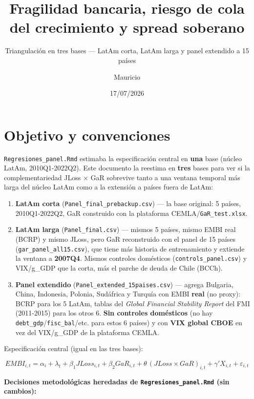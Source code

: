 \documentclass[
]{article}
\title{Fragilidad bancaria, riesgo de cola del crecimiento y spread
soberano}
\subtitle{Triangulación en tres bases --- LatAm corta, LatAm larga y
panel extendido a 15 países}
\author{Mauricio}
\date{17/07/2026}
\providecommand{\tightlist}{%
  \setlength{\itemsep}{0pt}\setlength{\parskip}{0pt}}
\begin{document}
\maketitle

{
\setcounter{tocdepth}{2}
\tableofcontents
}
\section{Objetivo y convenciones}\label{objetivo-y-convenciones}

\texttt{Regresiones\_panel.Rmd} estimaba la especificación central en
\textbf{una} base (núcleo LatAm, 2010Q1-2022Q2). Este documento la
reestima en \textbf{tres} bases para ver si la complementariedad JLoss ×
GaR sobrevive tanto a una ventana temporal más larga del núcleo LatAm
como a la extensión a países fuera de LatAm:

\begin{enumerate}
\def\labelenumi{\arabic{enumi}.}
\tightlist
\item
  \textbf{LatAm corta} (\texttt{Panel\_final\_prebackup.csv}) --- la
  base original: 5 países, 2010Q1-2022Q2, GaR construido con la
  plataforma CEMLA/\texttt{GaR\_test.xlsx}.
\item
  \textbf{LatAm larga} (\texttt{Panel\_final.csv}) --- mismos 5 países,
  mismo EMBI real (BCRP) y mismo JLoss, pero GaR reconstruido con el
  panel de 15 países (\texttt{gar\_panel\_all15.csv}), que tiene más
  historia de entrenamiento y extiende la ventana a \textbf{2007Q4}.
  Mismos controles domésticos (\texttt{controls\_panel.csv}) y
  VIX/g\_GDP que la corta, más el parche de deuda de Chile (BCCh).
\item
  \textbf{Panel extendido} (\texttt{Panel\_extended\_15paises.csv}) ---
  agrega Bulgaria, China, Indonesia, Polonia, Sudáfrica y Turquía con
  EMBI \textbf{real} (no proxy): BCRP para los 5 LatAm, tablas del
  \emph{Global Financial Stability Report} del FMI (2011-2015) para los
  otros 6. \textbf{Sin controles domésticos} (no hay
  \texttt{debt\_gdp}/\texttt{fisc\_bal}/etc. para estos 6 países) y con
  \textbf{VIX global CBOE} en vez del VIX/g\_GDP de la plataforma CEMLA.
\end{enumerate}

Especificación central (igual en las tres bases):

\[EMBI_{i,t}=\alpha_i+\lambda_t+\beta_1 JLoss_{i,t}+\beta_2 GaR_{i,t}+\theta\,(JLoss\times GaR)_{i,t}+\gamma' X_{i,t}+\varepsilon_{i,t}\]

\textbf{Decisiones metodológicas heredadas de
\texttt{Regresiones\_panel.Rmd} (sin cambios):}
\end{document}
